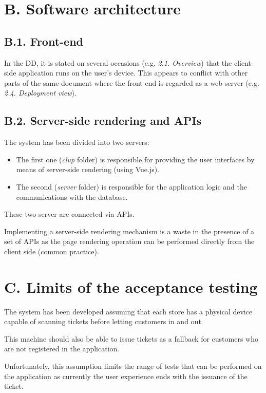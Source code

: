 \section{B. Software architecture}

\subsection{B.1. Front-end}

In the DD, it is stated on several occasions (e.g. \emph{2.1. Overview}) that the client-side application runs on the user's device. 
This appears to conflict with other parts of the same document where the front end is regarded as a web server (e.g. \emph{2.4. Deployment view}).

\subsection{B.2. Server-side rendering and APIs}

The system has been divided into two servers:
\begin{itemize}
    \item The first one (\emph{clup} folder) is responsible for providing the user interfaces by means of server-side rendering (using Vue.js).
    \item The second (\emph{server} folder) is responsible for the application logic and the communications with the database.
\end{itemize}
These two server are connected via APIs.

Implementing a server-side rendering mechanism is a waste in the presence of a set of APIs as the page rendering operation can be performed directly from the client side (common practice).

\section{C. Limits of the acceptance testing}

The system has been developed assuming that each store has a physical device capable of scanning tickets before letting customers in and out.

This machine should also be able to issue tickets as a fallback for customers who are not registered in the application.

Unfortunately, this assumption limits the range of tests that can be performed on the application as currently the user experience ends with the issuance of the ticket.

